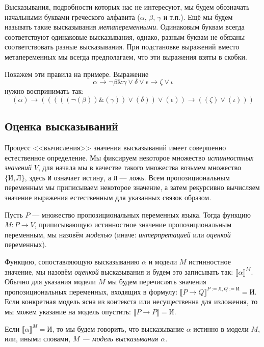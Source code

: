Высказывания, подробности
которых нас не интересуют, мы будем обозначать начальными буквами 
греческого алфавита
($\alpha$, $\beta$, $\gamma$ и т.п.). 
Ещё мы будем называть такие
высказывания \emph{метапеременными}.
Одинаковым буквам всегда соответствуют
одинаковые высказывания, однако, разным буквам не обязаны соответствовать
разные высказывания. 
При подстановке выражений вместо метапеременных мы всегда предполагаем,
что эти выражения взяты в скобки.

Покажем эти правила на примере. Выражение
$$\alpha \rightarrow \neg \beta \& \gamma \vee \delta \vee \epsilon \rightarrow \zeta\vee\iota$$
нужно воспринимать так:
$$(\alpha) \rightarrow \left(((((\neg (\beta)) \& (\gamma)) \vee (\delta)) \vee (\epsilon)) \rightarrow ((\zeta)\vee(\iota))\right)$$

\subsection{Оценка высказываний}

Процесс <<вычисления>> значения высказываний имеет совершенно
естественное определение. Мы фиксируем некоторое множество
\emph{истинностных значений} $V$, для начала мы в качестве такого множества возьмем 
множество $\{\texttt{И}, \texttt{Л}\}$, здесь \texttt{И} означает истину, а
\texttt{Л} --- ложь. Всем пропозициональным переменным мы приписываем некоторое
значение, а затем рекурсивно вычисляем значение выражения естественным для указанных
связок образом.

Пусть $P$ --- множество пропозициональных переменных языка.
Тогда функцию $M: P \rightarrow V$, приписывающую истинностное 
значение пропозициональным переменным, мы назовём \emph{моделью} 
(иначе: \emph{интерпретацией} или \emph{оценкой} переменных). 

Функцию, сопоставляющую высказыванию $\alpha$ и модели $M$
истинностное значение, мы назовём \emph{оценкой} высказывания и
будем это записывать так: $\llbracket \alpha \rrbracket ^ M$.
Обычно для указания модели $M$ мы будем перечислять значения
пропозициональных переменных, входящих в формулу:
$\llbracket P \rightarrow Q \rrbracket ^ {P:=\texttt{Л}, Q:=\texttt{И}} = \texttt{И}$.
Если конкретная модель ясна из контекста или несущественна для изложения, то
мы можем указание на модель опустить: $\llbracket P \rightarrow P \rrbracket = \texttt{И}$.

Если $\llbracket \alpha \rrbracket ^ M = \texttt{И}$, то мы будем 
говорить, что высказывание $\alpha$ истинно в модели $M$, или, иными словами,
\emph{$M$ --- модель высказывания $\alpha$}.

